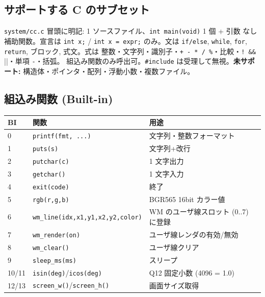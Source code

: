 \documentclass[a4paper,11pt]{ltjsarticle}
\begin{document}
\subsection{サポートする C のサブセット}
\verb|system/cc.c| 冒頭に明記: 1 ソースファイル、\verb|int main(void)| 1 個 + 引数
なし補助関数。宣言は \verb|int x;| / \verb|int x = expr;| のみ。文は
\verb|if/else|, \verb|while|, \verb|for|, \verb|return|, ブロック, 式文。式は
整数・文字列・識別子・\verb|+ - * / %|・比較・\verb|! && |||・単項 \verb|-|・括弧。
組込み関数のみ呼出可。\verb|#include| は受理して無視。\textbf{未サポート:}
構造体・ポインタ・配列・浮動小数・複数ファイル。

\subsection{組込み関数 (Built-in)}
\begin{center}\footnotesize
\begin{tabular}{@{}l l p{6.6cm}@{}}
\toprule \textbf{BI} & \textbf{関数} & \textbf{用途}\\ \midrule
0 & \verb|printf(fmt, ...)| & 文字列・整数フォーマット\\
1 & \verb|puts(s)| & 文字列+改行\\
2 & \verb|putchar(c)| & 1 文字出力\\
3 & \verb|getchar()| & 1 文字入力\\
4 & \verb|exit(code)| & 終了\\
5 & \verb|rgb(r,g,b)| & BGR565 16bit カラー値\\
6 & \verb|wm_line(idx,x1,y1,x2,y2,color)| & WM のユーザ線スロット (0..7) に登録\\
7 & \verb|wm_render(on)| & ユーザ線レンダの有効/無効\\
8 & \verb|wm_clear()| & ユーザ線クリア\\
9 & \verb|sleep_ms(ms)| & スリープ\\
10/11 & \verb|isin(deg)|/\verb|icos(deg)| & Q12 固定小数 (4096 = 1.0)\\
12/13 & \verb|screen_w()|/\verb|screen_h()| & 画面サイズ取得\\
\bottomrule
\end{tabular}
\end{center}
\end{document}
